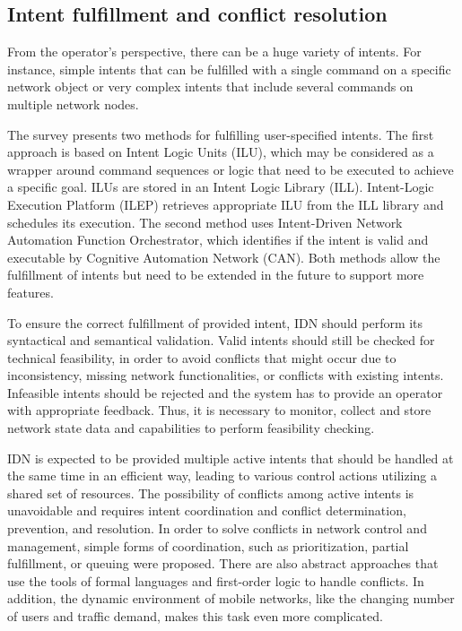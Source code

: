 \subsection{Intent fulfillment and conflict resolution}

From the operator’s perspective, there can be a huge variety of intents. For instance, simple intents that can be fulfilled with a single command on a specific network object or very complex intents that include several commands on multiple network nodes.

The survey \cite{Mwanje2021} presents two methods for fulfilling user-specified intents. The first approach is based on Intent Logic Units (ILU), which may be considered as a wrapper around command sequences or logic that need to be executed to achieve a specific goal. ILUs are stored in an Intent Logic Library (ILL). Intent-Logic Execution Platform (ILEP) retrieves appropriate ILU from the ILL library and schedules its execution. The second method uses Intent-Driven Network Automation Function Orchestrator, which identifies if the intent is valid and executable by Cognitive Automation Network (CAN). Both methods allow the fulfillment of intents but need to be extended in the future to support more features.

To ensure the correct fulfillment of provided intent, IDN should perform its syntactical and semantical validation. Valid intents should still be checked for technical feasibility, in order to avoid conflicts that might occur due to inconsistency, missing network functionalities, or conflicts with existing intents. Infeasible intents should be rejected and the system has to provide an operator with appropriate feedback. Thus, it is necessary to monitor, collect and store network state data and capabilities to perform feasibility checking.

IDN is expected to be provided multiple active intents that should be handled at the same time in an efficient way, leading to various control actions utilizing a shared set of resources. The possibility of conflicts among active intents is unavoidable and requires intent coordination and conflict determination, prevention, and resolution. In order to solve conflicts in network control and management, simple forms of coordination, such as prioritization, partial fulfillment, or queuing were proposed. There are also abstract approaches that use the tools of formal languages and first-order logic to handle conflicts. In addition, the dynamic environment of mobile networks, like the changing number of users and traffic demand, makes this task even more complicated. \cite{Mwanje2021}

